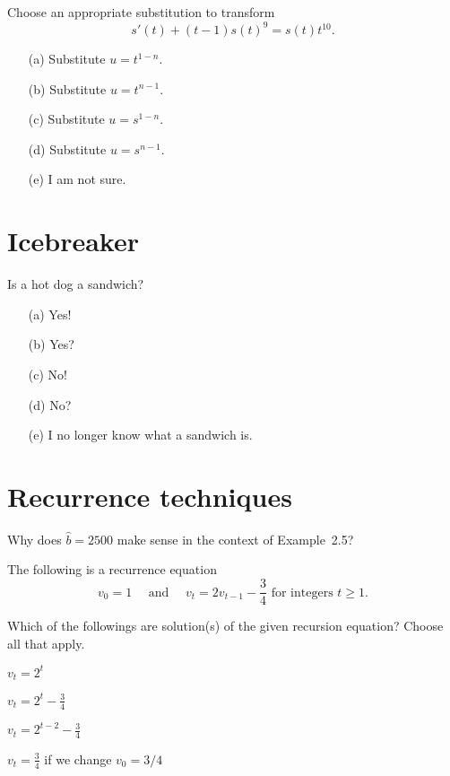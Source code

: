 \documentclass[14pt]{beamer}
\begin{document}
\begin{frame}[t]
  Choose an appropriate substitution to transform
  \[
    s'(t) + (t-1)s(t)^{9} = s(t) t^{10}.
  \]

  \begin{itemize} \setlength\itemsep{1ex}
    \item[(a)] Substitute \(u = t^{1-n}\).
    \item[(b)] Substitute \(u = t^{n-1}\).
    \item[(c)] Substitute \(u = s^{1-n}\).
    \item[(d)] Substitute \(u = s^{n-1}\).
    \item[(e)] I am not sure.
  \end{itemize} 
\end{frame}

\section{Icebreaker}

\begin{frame}
  Is a hot dog a sandwich?
  
  \medskip
  \begin{itemize} \setlength\itemsep{2ex}
    \item[(a)] Yes!
    \item[(b)] Yes?
    \item[(c)] No!
    \item[(d)] No?
    \item[(e)] I no longer know what a sandwich is.
  \end{itemize} 
\end{frame}

\section{Recurrence techniques}

\begin{frame}
  Why does \(\hat{b} = 2500\) make sense in the context of Example~2.5?
\end{frame}


\begin{frame}[t]
  The following is a recurrence equation
  \[
    v_{0} = 1 \quad\text{ and }\quad v_{t} = 2 v_{t-1} - \frac{3}{4} \text{ for integers } t \ge 1.
  \]

  Which of the followings are solution(s) of the given recursion equation? Choose all that apply.

  \begin{enumerate*}[label=\textbf{(\alph*)}, before=\hfill, after={\hfill}, itemjoin={\hspace{2em}}]
    \item \(v_{t} = 2^{t}\)
    \item \(v_{t} = 2^{t} - \frac{3}{4}\)
    \item \(v_{t} = 2^{t-2} - \frac{3}{4}\)
    \item \(v_{t} = \frac{3}{4}\) if we change \(v_{0} = 3/4\)
  \end{enumerate*}
\end{frame}
\end{document}
